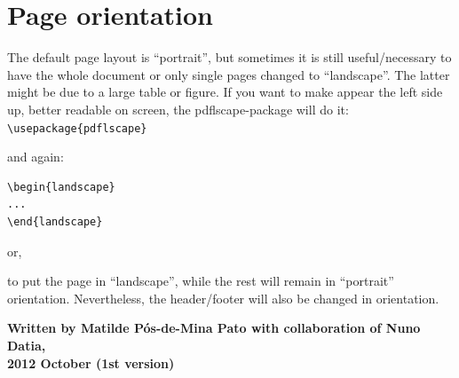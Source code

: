 \section{Page orientation}

\begin{sloppypar}
The default page layout is ``portrait'', but sometimes it is still useful/necessary to have the whole document or only single pages changed to ``landscape''. The latter might be due to a large table or figure. If you want to make appear the left side up, better readable on screen, the pdflscape-package will do it:
\verb|\usepackage{pdflscape}|
\end{sloppypar}
and again:
\begin{verbatim}
\begin{landscape}
...
\end{landscape}
\end{verbatim}

or, 
\verb||

to put the page in ``landscape'', while the rest will remain in ``portrait'' orientation. Nevertheless, the header/footer will also be changed in orientation.

\begin{center}
 \textbf{Written by Matilde Pós-de-Mina Pato with collaboration of Nuno Datia, \\2012 October (1st version)}   
\end{center}


